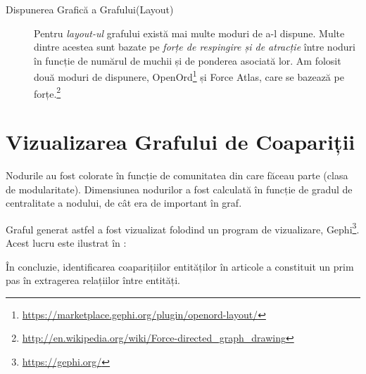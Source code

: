 \begin{description}
 
 \item[Dispunerea Grafică a Grafului(Layout)] Pentru \textit{layout-ul} grafului există mai multe moduri de a-l dispune. Multe dintre acestea sunt bazate pe \textit{forțe de respingire și de atracție} între noduri în funcție de numărul de muchii și de ponderea asociată lor. Am folosit două moduri de dispunere, OpenOrd\footnote{\url{https://marketplace.gephi.org/plugin/openord-layout/}} și Force Atlas, care se bazează pe forțe.\footnote{\url{http://en.wikipedia.org/wiki/Force-directed_graph_drawing}}
\end{description}

 
\section{Vizualizarea Grafului de Coapariții}

Nodurile au fost colorate în funcție de comunitatea din care făceau parte (clasa de modularitate). Dimensiunea nodurilor a fost calculată în funcție de gradul de centralitate a nodului, de cât era de important în graf.

Graful generat astfel a fost vizualizat folodind un program de vizualizare, Gephi\footnote{\url{https://gephi.org/}}. Acest lucru este ilustrat în :



În concluzie, identificarea coaparițiilor entităților în articole a constituit un prim pas în extragerea relațiilor între entități.

